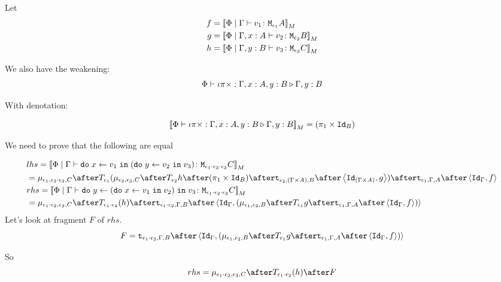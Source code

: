 \documentclass{report}
\begin{document}
Let
\begin{align}
    f ={}& {\bf [\![}\Phi\mid\Gamma \vdash v_1 \colon \texttt{M}_{\epsilon_1}{A}{\bf ]\!]}_M\\
    g ={}& {\bf [\![}\Phi\mid\Gamma, x: A \vdash v_2 \colon \texttt{M}_{\epsilon_2}{B}{\bf ]\!]}_M\\
    h ={}& {\bf [\![}\Phi\mid\Gamma, y: B \vdash v_3 \colon \texttt{M}_{\epsilon_3}{C}{\bf ]\!]}_M\\
\end{align}

We also have the weakening:
\begin{equation}
    \Phi\vdash \iota\pi\times : \Gamma, x: A, y: B \triangleright \Gamma, y: B
\end{equation}

With denotation:

\begin{equation}
    {\bf [\![}\Phi\vdash \iota\pi\times : \Gamma, x: A, y: B \triangleright \Gamma, y: B{\bf ]\!]}_M = (\pi_1 \times \texttt{Id}_{B})
\end{equation}

We need to prove that the following are equal

\begin{align}
    &lhs =  \deno{\gpetyperelation{\doin{x}{v_1}{(\doin{y}{v_2}{v_3})}}{\M{\e_1\dot\e_2\dot\e_2}{C}}} \\
    & = \bind{\e_1}{\e_2\dot\e_3}{C}\after\T{
        \e_1}{(\bind{\e_2}{\e_3}{C}\after\T{\e_2}{h\after(\p \times \Id{B})}\after\tstrength{\e_2}{(\G\times A)}{B}\after\pr{\Id{(\G\times A)}}{g}
        )}\after\tstrength{\e_1}{\G}{A}\after\pr{\idg}{f}\\
    & rhs = \deno{\gpetyperelation{\doin{y}{(\doin{x}{v_1}{v_2})}{v_3}}{\M{\e_1\dot\e_2\dot\e_2}{C}}}  \\
    & = \bind{\e_1\dot\e_2}{\e_3}{C}\after\T{\e_1\dot\e_2}{(h)}\after\tstrength{\e_1\dot\e_2}{\G}{B}\after\pr{\idg}{(\bind{\e_1}{\e_2}{B}\after\T{\e_1}{g}\after\tstrength{\e_1}{\G}{A}\after\pr{\idg}{f})} \\
\end{align}
Let's look at fragment $F$ of $rhs$.
\begin{equation}
    F = \tstrength{\e_1\dot\e_2}{\G}{B}\after\pr{\idg}{(\bind{\e_1}{\e_2}{B}\after\T{\e_1}{g}\after\tstrength{\e_1}{\G}{A}\after\pr{\idg}{f})}
\end{equation}

So 
\begin{equation}
    rhs = \bind{\e_1\dot\e_2}{\e_3}{C}\after\T{\e_1\dot\e_2}{(h)}\after F
\end{equation}
\end{document}
